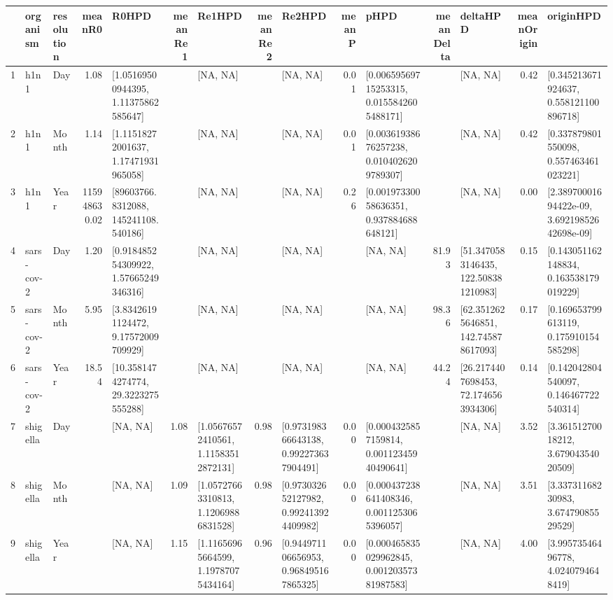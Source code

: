 \documentclass{article}
\begin{document}
\begin{spacing}{1.5}
\begin{table}[ht]
\centering
\begin{tabular}{rllrlrlrlrlrlrl}
  \hline
 & organism & resolution & meanR0 & R0HPD & meanRe1 & Re1HPD & meanRe2 & Re2HPD & meanP & pHPD & meanDelta & deltaHPD & meanOrigin & originHPD \\ 
  \hline
1 & h1n1 & Day & 1.08 & [1.05169500944395, 1.11375862585647] &  & [NA, NA] &  & [NA, NA] & 0.01 & [0.00659569715253315, 0.0155842605488171] &  & [NA, NA] & 0.42 & [0.345213671924637, 0.558121100896718] \\ 
  2 & h1n1 & Month & 1.14 & [1.11518272001637, 1.17471931965058] &  & [NA, NA] &  & [NA, NA] & 0.01 & [0.00361938676257238, 0.0104026209789307] &  & [NA, NA] & 0.42 & [0.337879801550098, 0.557463461023221] \\ 
  3 & h1n1 & Year & 115948630.02 & [89603766.8312088, 145241108.540186] &  & [NA, NA] &  & [NA, NA] & 0.26 & [0.00197330058636351, 0.937884688648121] &  & [NA, NA] & 0.00 & [2.38970001694422e-09, 3.69219852642698e-09] \\ 
  4 & sars-cov-2 & Day & 1.20 & [0.918485254309922, 1.57665249346316] &  & [NA, NA] &  & [NA, NA] &  & [NA, NA] & 81.93 & [51.3470583146435, 122.508381210983] & 0.15 & [0.143051162148834, 0.163538179019229] \\ 
  5 & sars-cov-2 & Month & 5.95 & [3.83426191124472, 9.17572009709929] &  & [NA, NA] &  & [NA, NA] &  & [NA, NA] & 98.36 & [62.3512625646851, 142.745878617093] & 0.17 & [0.169653799613119, 0.175910154585298] \\ 
  6 & sars-cov-2 & Year & 18.54 & [10.3581474274774, 29.3223275555288] &  & [NA, NA] &  & [NA, NA] &  & [NA, NA] & 44.24 & [26.2174407698453, 72.1746563934306] & 0.14 & [0.142042804540097, 0.146467722540314] \\ 
  7 & shigella & Day &  & [NA, NA] & 1.08 & [1.05676572410561, 1.11583512872131] & 0.98 & [0.973198366643138, 0.992273637904491] & 0.00 & [0.0004325857159814, 0.00112345940490641] &  & [NA, NA] & 3.52 & [3.36151270018212, 3.67904354020509] \\ 
  8 & shigella & Month &  & [NA, NA] & 1.09 & [1.05727663310813, 1.12069886831528] & 0.98 & [0.973032652127982, 0.992413924409982] & 0.00 & [0.000437238641408346, 0.0011253065396057] &  & [NA, NA] & 3.51 & [3.33731168230983, 3.67479085529529] \\ 
  9 & shigella & Year &  & [NA, NA] & 1.15 & [1.11656965664599, 1.19787075434164] & 0.96 & [0.944971106656953, 0.968495167865325] & 0.00 & [0.000465835029962845, 0.00120357381987583] &  & [NA, NA] & 4.00 & [3.99573546496778, 4.0240794648419] \\ 

\end{tabular}
\end{table}
\end{spacing}
\end{document}
